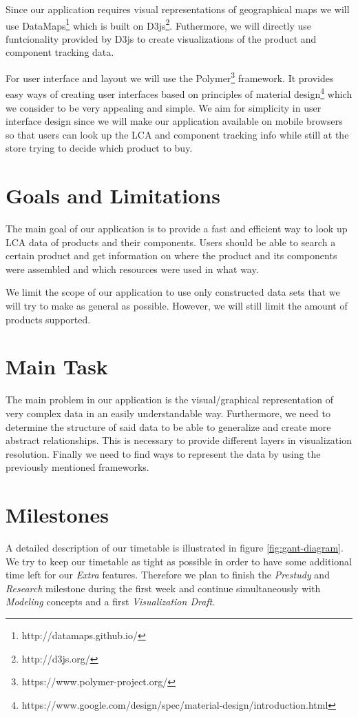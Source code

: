 \documentclass[a4page]{article}
\begin{document}
Since our application requires visual representations of geographical maps we will use DataMaps\footnote{http://datamaps.github.io/} which is built on D3js\footnote{http://d3js.org/}.
Futhermore, we will directly use funtcionality provided by D3js to create visualizations of the product and component tracking data.

For user interface and layout we will use the Polymer\footnote{https://www.polymer-project.org/} framework. 
It provides easy ways of creating user interfaces based on principles of material design\footnote{https://www.google.com/design/spec/material-design/introduction.html} which we consider to be very appealing and simple.
We aim for simplicity in user interface design since we will make our application available on mobile browsers so that users can look up the \ac{LCA} and component tracking info while still at the store trying to decide which product to buy.

\section{Goals and Limitations}
The main goal of our application is to provide a fast and efficient way to look up \ac{LCA} data of products and their components.
Users should be able to search a certain product and get information on where the product and its components were assembled and which resources were used in what way. 

We limit the scope of our application to use only constructed data sets that we will try to make as general as possible. 
However, we will still limit the amount of products supported.

\section{Main Task}
The main problem in our application is the visual/graphical representation of very complex data in an easily understandable way.
Furthermore, we need to determine the structure of said data to be able to generalize and create more abstract relationships.
This is necessary to provide different layers in visualization resolution.
Finally we need to find ways to represent the data by using the previously mentioned frameworks.

\section{Milestones}

A detailed description of our timetable is illustrated in figure \ref{fig:gant-diagram}. We try to keep our timetable as tight as possible in order to have some additional time left for our \textit{Extra} features. Therefore we plan to finish the \textit{Prestudy} and \textit{Research} milestone during the first week and continue simultaneously with \textit{Modeling} concepts and a first \textit{Visualization Draft}. 
\end{document}
